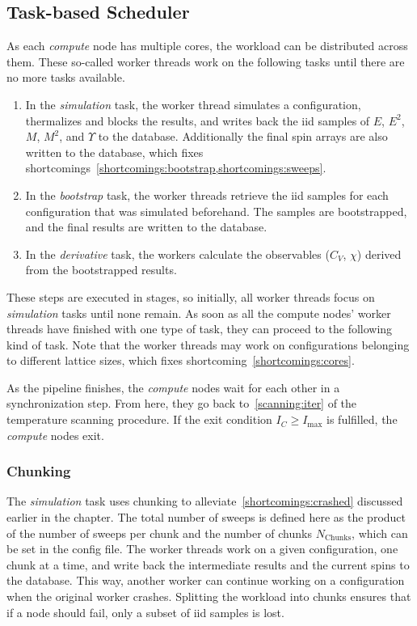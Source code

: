 \subsection{Task-based Scheduler}\label{sec:impl:tasks}
	As each \emph{compute} node has multiple cores, the workload can be distributed across them. These so-called worker threads work on the following tasks until there are no more tasks available.
	\begin{enumerate}
		\item In the \emph{simulation} task, the worker thread simulates a configuration, thermalizes and blocks the results, and writes back the iid samples of $E$, $E^2$, $M$, $M^2$, and $\Upsilon$ to the database. Additionally the final spin arrays are also written to the database, which fixes shortcomings~\cref{shortcomings:bootstrap,shortcomings:sweeps}.
		\item In the \emph{bootstrap} task, the worker threads retrieve the iid samples for each configuration that was simulated beforehand. The samples are bootstrapped, and the final results are written to the database.
		\item In the \emph{derivative} task, the workers calculate the observables ($C_V$, $\chi$) derived from the bootstrapped results.
	\end{enumerate}
	These steps are executed in stages, so initially, all worker threads focus on \emph{simulation} tasks until none remain. As soon as all the compute nodes' worker threads have finished with one type of task, they can proceed to the following kind of task. Note that the worker threads may work on configurations belonging to different lattice sizes, which fixes shortcoming~\cref{shortcomings:cores}.
	
	As the pipeline finishes, the \emph{compute} nodes wait for each other in a synchronization step. From here, they go back to~\cref{scanning:iter} of the temperature scanning procedure. If the exit condition $I_C \ge I_\text{max}$ is fulfilled, the \emph{compute} nodes exit.

	\subsubsection{Chunking}\label{sec:impl:tasks:chunks}
		The \emph{simulation} task uses chunking to alleviate~\cref{shortcomings:crashed} discussed earlier in the chapter. The total number of sweeps is defined here as the product of the number of sweeps per chunk and the number of chunks $N_\text{Chunks}$, which can be set in the config file. The worker threads work on a given configuration, one chunk at a time, and write back the intermediate results and the current spins to the database. This way, another worker can continue working on a configuration when the original worker crashes. Splitting the workload into chunks ensures that if a node should fail, only a subset of iid samples is lost.

